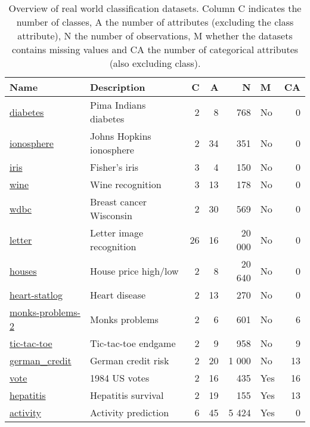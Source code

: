 \begin{table}
\centering
\begin{tabular}[htp]{ l l r r r l r }
    Name & Description & C & A & N & M & CA \\ \hline
    \href{https://www.openml.org/d/37}{diabetes} & Pima Indians diabetes & 2 & 8 & 768 & No & 0 \\
    \href{https://www.openml.org/d/59}{ionosphere} & Johns Hopkins ionosphere & 2 & 34 & 351 & No & 0 \\
    \href{https://www.openml.org/d/61}{iris} & Fisher's iris & 3 & 4 & 150 & No & 0 \\
    \href{https://www.openml.org/d/187}{wine} & Wine recognition & 3 & 13 & 178 & No & 0 \\
    \href{https://www.openml.org/d/1510}{wdbc} & Breast cancer Wisconsin & 2 & 30 & 569 & No & 0 \\
    \href{https://www.openml.org/d/6}{letter} & Letter image recognition & 26 & 16 & 20 000 & No & 0 \\
    \href{https://www.openml.org/d/823}{houses} & House price high/low & 2 & 8 & 20 640 & No & 0 \\
    \href{https://www.openml.org/d/53}{heart-statlog} & Heart disease & 2 & 13 & 270 & No & 0 \\
    \href{https://www.openml.org/d/334}{monks-problems-2} & Monks problems & 2 & 6 & 601 & No & 6 \\
    \href{https://www.openml.org/d/50}{tic-tac-toe} & Tic-tac-toe endgame & 2 & 9 & 958 & No & 9 \\
    \href{https://www.openml.org/d/31}{german\_credit} & German credit risk & 2 & 20 & 1 000 & No & 13 \\
    \href{https://www.openml.org/d/56}{vote} & 1984 US votes & 2 & 16 & 435 & Yes & 16 \\
    \href{https://www.openml.org/d/55}{hepatitis} & Hepatitis survival & 2 & 19 & 155 & Yes & 13 \\
    \href{http://www.cis.fordham.edu/wisdm/dataset.php}{activity} & Activity prediction & 6 & 45 & 5 424 & Yes & 0 \\
\end{tabular}
\caption{Overview of real world classification datasets. Column C indicates the number of classes, A the number of attributes (excluding the class attribute), N the number of observations, M whether the datasets contains missing values and CA the number of categorical attributes (also excluding class).}%
\label{tbl:datasets}
\end{table}

